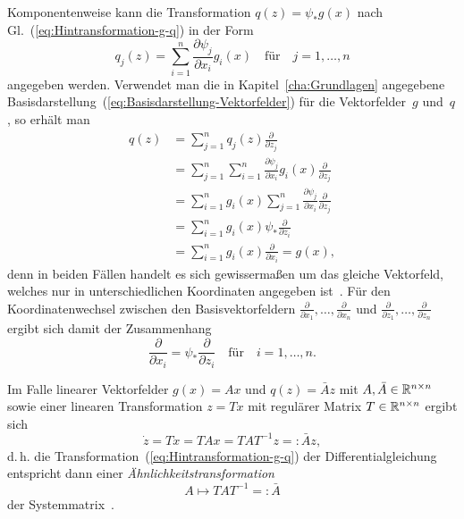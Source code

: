 Komponentenweise kann die Transformation $q(z)=\psi_{*}g(x)$ nach
Gl.~(\ref{eq:Hintransformation-g-q}) in der Form 
\[
q_{j}(z)=\sum_{i=1}^{n}\frac{\partial\psi_{j}}{\partial x_{i}}g_{i}(x)\quad\mbox{für}\quad j=1,\ldots,n
\]
angegeben werden. Verwendet man die in Kapitel~\ref{cha:Grundlagen}
angegebene Basisdarstellung~(\ref{eq:Basisdarstellung-Vektorfelder})
für die Vektorfelder~$g$ und~$q$, so erhält man 
\[
\begin{aligned}q(z) & =\sum_{j=1}^{n}q_{j}(z)\frac{\partial}{\partial z_{j}}\\
 & =\sum_{j=1}^{n}\sum_{i=1}^{n}\frac{\partial\psi_{j}}{\partial x_{i}}g_{i}(x)\frac{\partial}{\partial z_{j}}\\
 & =\sum_{i=1}^{n}g_{i}(x)\sum_{j=1}^{n}\frac{\partial\psi_{j}}{\partial x_{i}}\frac{\partial}{\partial z_{j}}\\
 & =\sum_{i=1}^{n}g_{i}(x)\psi_{*}\frac{\partial}{\partial z_{i}}\\
 & =\sum_{i=1}^{n}g_{i}(x)\frac{\partial}{\partial x_{i}}=g(x),
\end{aligned}
\]
denn in beiden Fällen handelt es sich gewissermaßen um das gleiche
Vektorfeld, welches nur in unterschiedlichen Koordinaten angegeben
ist~\cite[Abschnitt~{3.1.1}]{isham2001}. Für den Koordinatenwechsel
zwischen den Basisvektorfeldern $\frac{\partial}{\partial x_{1}},\ldots,\frac{\partial}{\partial x_{n}}$
und $\frac{\partial}{\partial z_{1}},\ldots,\frac{\partial}{\partial z_{n}}$
ergibt sich damit der Zusammenhang 
\[
\frac{\partial}{\partial x_{i}}=\psi_{*}\frac{\partial}{\partial z_{i}}\quad\mbox{für}\quad i=1,\ldots,n.
\]

\begin{example}
Im Falle linearer Vektorfelder $g(x)=Ax$ und $q(z)=\bar{A}z$ mit
$A,\bar{A}\in{\mathbb{R}}^{n\times n}$ sowie einer linearen Transformation
$z=Tx$ mit regulärer Matrix $T\in{\mathbb{R}}^{n\times n}$ ergibt sich 
\[
\dot{z}=T\dot{x}=TAx=TAT^{-1}z=:\bar{A}z,
\]
d.\,h. die Transformation~(\ref{eq:Hintransformation-g-q}) der
Differentialgleichung entspricht dann einer \emph{Ähnlichkeitstransformation}
\[
A\mapsto TAT^{-1}=:\bar{A}
\]
der Systemmatrix~\cite{lunze-rt2}.
\end{example}

